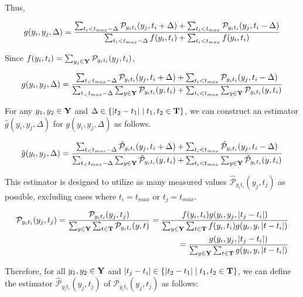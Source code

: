 Thus,

\begin{align}
g(y_i, y_j, \Delta)= {\sum_{t_i< t_{max}-\Delta}\mathcal{P}_{y_it_i}(y_j, t_i+\Delta)+\sum_{t_i<t_{max}} \mathcal{P}_{y_it_i}(y_j, t_i-\Delta)\over \sum_{t_i< t_{max}-\Delta}f(y_i, t_i)+\sum_{t_i<t_{max}}f(y_i, t_i)}
\end{align}

Since $f(y_i, t_i)=\sum_{y_j\in\bold Y}\mathcal{P}_{y_it_i}(y_j, t_i)$,

\begin{align}
g(y_i, y_j, \Delta)= {\sum_{t_< t_{max}-\Delta}\mathcal{P}_{y_it_i}(y_j, t_i+\Delta)+\sum_{t_i<t_{max}} \mathcal{P}_{y_it_i}(y_j, t_i-\Delta)\over \sum_{t_< t_{max}-\Delta}\sum_{y\in\bold Y}\mathcal{P}_{y_it_i}(y, t_i)+\sum_{t_i<t_{max}}\sum_{y\in\bold Y}\mathcal{P}_{y_it_i}(y, t_i)}
\end{align}

For any $y_1, y_2 \in \bold{Y}$ and $\Delta \in \{|t_2 -t_1 | \mid t_1, t_2\in \bold{T}\}$, we can construct an estimator $\hat{g}(y_i, y_j, \Delta)$ for $g(y_i, y_j, \Delta)$ as follows.

\begin{align}
\hat{g}(y_i, y_j, \Delta)= {\sum_{t_< t_{max}-\Delta}\hat{\mathcal{P}}_{y_it_i}(y_j, t_i+\Delta)+\sum_{t_i<t_{max}} \hat{\mathcal{P}}_{y_it_i}(y_j, t_i-\Delta)\over \sum_{t_< t_{max}-\Delta}\sum_{y\in\bold Y}\hat{\mathcal{P}}_{y_it_i}(y, t_i)+\sum_{t_i<t_{max}}\sum_{y\in\bold Y}\hat{\mathcal{P}}_{y_it_i}(y, t_i)}
\end{align}

This estimator is designed to utilize as many measured values $\hat{\mathcal{P}}_{y_i t_i} (y_j ,t_j)$ as possible, excluding cases where $t_i=t_{max}$ or $t_j=t_{max}$.

\begin{align}
\mathcal P_{y_i t_i}(y_j, t_j)= {\mathcal P_{y_i t_i}(y_j, t_j)\over \sum_{y\in \bold{Y}}\sum_{t\in\bold{T}}\mathcal{P}_{y_i t_i}(y, t)}={f(y_i,t_i)g(y_i, y_j, |t_j-t_i|)\over \sum_{y\in \bold{Y}}\sum_{t\in\bold{T}}f(y_i,t_i)g(y_i, y, |t-t_i|)}\\={g(y_i, y_j, |t_j-t_i|)\over \sum_{y\in \bold{Y}}\sum_{t\in\bold{T}}g(y_i, y, |t-t_i|)}
\end{align}

Therefore, for all $y_1, y_2 \in \bold{Y}$ and $|t_j - t_i |\in\{|t_2 -t_1 | \mid t_1, t_2\in \bold{T}\}$, we can define the estimator $\hat{\mathcal P}_{y_i t_i}(y_j, t_j)$ of $\mathcal P_{y_i t_i}(y_j, t_j)$ as follows:

